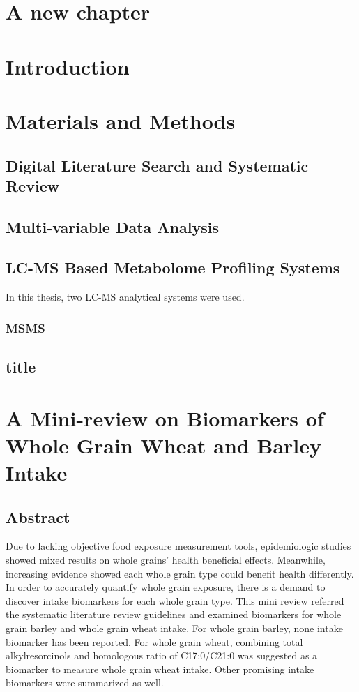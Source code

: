 \documentclass[]{report}
\begin{document}
%
\chapter{A new chapter}
\chapter{Introduction}


\chapter{Materials and Methods}

\section{Digital Literature Search and Systematic Review}

\section{Multi-variable Data Analysis}


\section{LC-MS Based Metabolome Profiling Systems}
In this thesis, two LC-MS analytical systems were used.

\subsection{MSMS}

\section{title}

\chapter{A Mini-review on Biomarkers of Whole Grain Wheat and Barley Intake}
	\section{Abstract}
	Due to lacking objective food exposure measurement tools, epidemiologic studies showed mixed results on whole grains' health beneficial effects.
	Meanwhile, increasing evidence showed each whole grain type could benefit health differently. 
	In order to accurately quantify whole grain exposure, there is a demand to discover intake biomarkers for each whole grain type.
	This mini review referred the systematic literature review guidelines and examined biomarkers for whole grain barley and whole grain wheat intake.
	For whole grain barley, none intake biomarker has been reported.
	For whole grain wheat, combining total alkylresorcinols and homologous ratio of C17:0/C21:0 was suggested as a biomarker to measure whole grain wheat intake.
	Other promising intake biomarkers were summarized as well.
\end{document}
